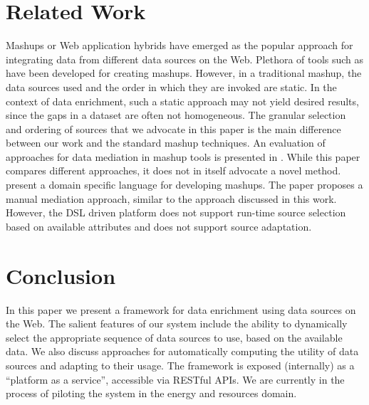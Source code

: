 \section{Related Work}

Mashups or Web application hybrids \cite{merrill2006mashups} have emerged as the popular approach for integrating data from different data sources on the Web. Plethora of tools such as \cite{maximilien2007domain,fagan2007mashing,opk}
have been developed for creating mashups. However, in a traditional mashup, the data sources used and 
the order in which they are invoked are static. In the context of data enrichment, such a static approach may not yield desired results, since the gaps in a dataset are often not homogeneous. The granular selection and 
ordering of sources that we advocate in this paper is the main difference between our work and the standard mashup techniques. 
An evaluation of approaches for data mediation in mashup tools is presented in \cite{di2009data}. While this paper compares different approaches, it does not in itself advocate a novel method. 
\cite{maximilien2007domain} present a domain specific language for developing mashups. The paper proposes a manual mediation approach, similar to 
the approach discussed in this work. However, the DSL driven platform does not support run-time source selection based on available attributes and does not support source adaptation.   

\section{Conclusion}
In this paper we present a framework for data enrichment using data sources on the Web. The salient features of our system include the ability to dynamically select the appropriate sequence of data sources to use, based on the 
available data. 
We also discuss approaches for automatically computing the utility of data sources and adapting to their usage. The framework is exposed (internally) as a ``platform as a service'', accessible via RESTful APIs. 
We are currently in the process of piloting the system in the energy and resources domain. 
